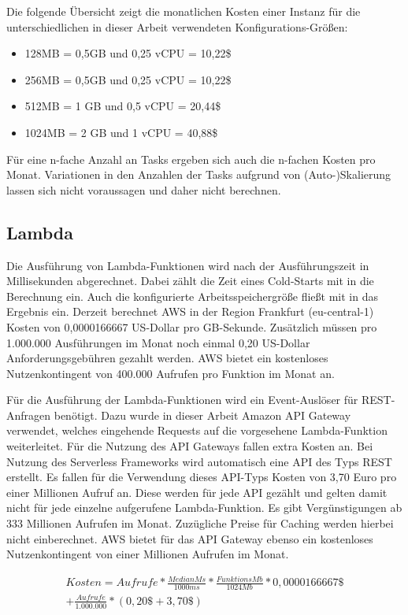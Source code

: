 Die folgende Übersicht zeigt die monatlichen Kosten einer Instanz für die unterschiedlichen in dieser Arbeit verwendeten Konfigurations-Größen:

\begin{itemize}
    \item 128MB = 0,5GB und 0,25 vCPU = 10,22\$
    \item 256MB = 0,5GB und 0,25 vCPU = 10,22\$
    \item 512MB = 1  GB und 0,5  vCPU = 20,44\$
    \item 1024MB = 2 GB und 1    vCPU = 40,88\$
\end{itemize}
Für eine n-fache Anzahl an Tasks ergeben sich auch die n-fachen Kosten pro Monat. Variationen in den Anzahlen der Tasks aufgrund von (Auto-)Skalierung lassen sich nicht voraussagen und daher nicht berechnen.


\subsection{Lambda}
Die Ausführung von Lambda-Funktionen wird nach der Ausführungszeit in Millisekunden abgerechnet. Dabei zählt die Zeit eines Cold-Starts mit in die Berechnung ein. Auch die konfigurierte Arbeitsspeichergröße fließt mit in das Ergebnis ein. Derzeit berechnet AWS in der Region Frankfurt (eu-central-1) Kosten von 0,0000166667 US-Dollar pro GB-Sekunde\cite{noauthor_lambda_nodate}. Zusätzlich müssen pro 1.000.000 Ausführungen im Monat noch einmal 0,20 US-Dollar Anforderungsgebühren gezahlt werden. AWS bietet ein kostenloses Nutzenkontingent von 400.000 Aufrufen pro Funktion im Monat an.

Für die Ausführung der Lambda-Funktionen wird ein Event-Auslöser für REST-Anfragen benötigt. Dazu wurde in dieser Arbeit Amazon API Gateway verwendet, welches eingehende Requests auf die vorgesehene Lambda-Funktion weiterleitet. Für die Nutzung des API Gateways fallen extra Kosten an. Bei Nutzung des Serverless Frameworks wird automatisch eine API des Typs REST erstellt. Es fallen für die Verwendung dieses API-Typs Kosten von 3,70 Euro pro einer Millionen Aufruf an. Diese werden für jede API gezählt und gelten damit nicht für jede einzelne aufgerufene Lambda-Funktion. Es gibt Vergünstigungen ab 333 Millionen Aufrufen im Monat. Zuzügliche Preise für Caching werden hierbei nicht einberechnet. AWS bietet für das API Gateway ebenso ein kostenloses Nutzenkontingent von einer Millionen Aufrufen im Monat\cite{noauthor_amazon_nodate}.

\begin{equation}
\begin{split}
Kosten = Aufrufe * \frac{MedianMs}{1000ms} * \frac{FunktionsMb}{1024Mb} * 0,0000166667\$ \\
+ \frac{Aufrufe}{1.000.000} * (0,20\$ + 3,70\$)
\end{split}
\end{equation}

